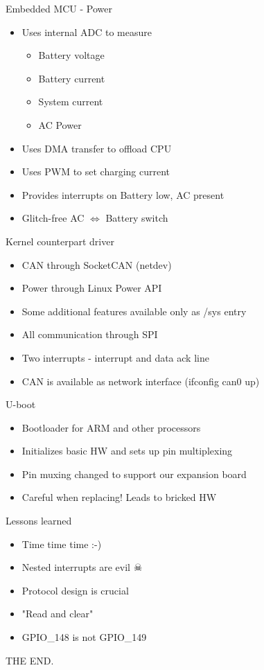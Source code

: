\documentclass{beamer}
\begin{document}
\begin{frame}{Embedded MCU - Power}
\begin{itemize}
	\item Uses internal ADC to measure
	\begin{itemize}
		\item Battery voltage
		\item Battery current
		\item System current
		\item AC Power
	\end{itemize}
	\item Uses DMA transfer to offload CPU
	\item Uses PWM to set charging current
	\item Provides interrupts on Battery low, AC present
	\item Glitch-free AC \(\Leftrightarrow\) Battery switch
\end{itemize}
\end{frame}

\begin{frame}{Kernel counterpart driver}
\begin{itemize}
	\item CAN through SocketCAN (netdev)
	\item Power through Linux Power API
	\item Some additional features available only as /sys entry

	\item All communication through SPI
	\item Two interrupts - interrupt and data ack line

	\item CAN is available as network interface (ifconfig can0 up)
\end{itemize}
\end{frame}

\begin{frame}{U-boot}
\begin{itemize}
	\item Bootloader for ARM and other processors
	\item Initializes basic HW and sets up pin multiplexing
	\item Pin muxing changed to support our expansion board
	\item Careful when replacing! Leads to bricked HW
\end{itemize}
\end{frame}

\begin{frame}{Lessons learned}
\begin{itemize}
	\item Time time time :-)
	\item Nested interrupts are evil \(\skull\)
	\item Protocol design is crucial
	\item "Read and clear"
	\item GPIO\_148 is not GPIO\_149
\end{itemize}
\end{frame}

\begin{frame}{THE END.}
\end{frame}
\end{document}
